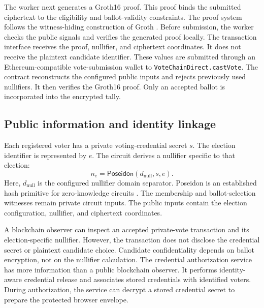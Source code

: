 The worker next generates a Groth16 proof. This proof binds the submitted
ciphertext to the eligibility and ballot-validity constraints. The proof
system follows the witness-hiding construction of Groth
\citep{groth2016snark}. Before submission, the worker checks the public
signals and verifies the generated proof locally.
The transaction interface receives the proof, nullifier, and ciphertext
coordinates. It does not receive the plaintext candidate identifier. These
values are submitted through an Ethereum-compatible vote-submission wallet
to \texttt{VoteChainDirect.castVote}. The contract reconstructs the configured
public inputs and rejects previously used nullifiers. It then verifies the
Groth16 proof. Only an accepted ballot is incorporated into the encrypted
tally.


\subsection{Public information and identity linkage}
\label{subsec:information-boundaries}

Each registered voter has a private voting-credential secret $s$. The election
identifier is represented by $e$. The circuit derives a nullifier specific
to that election:
\begin{equation}
  n_e = \mathsf{Poseidon}(d_{\mathrm{null}},s,e).
  \label{eq:system-nullifier}
\end{equation}
Here, $d_{\mathrm{null}}$ is the configured nullifier domain separator.
Poseidon is an established hash primitive for zero-knowledge circuits
\citep{grassi2021poseidon}. The membership and ballot-selection witnesses
remain private circuit inputs. The public inputs contain the election
configuration, nullifier, and ciphertext coordinates.

A blockchain observer can inspect an accepted private-vote transaction and
its election-specific nullifier. However, the transaction does not disclose
the credential secret or plaintext candidate choice. Candidate
confidentiality depends on ballot encryption, not on the nullifier
calculation.
The credential authorization service has more information than a public
blockchain observer. It performs identity-aware credential release and
associates stored credentials with identified voters. During authorization,
the service can decrypt a stored credential secret to prepare the protected
browser envelope.

